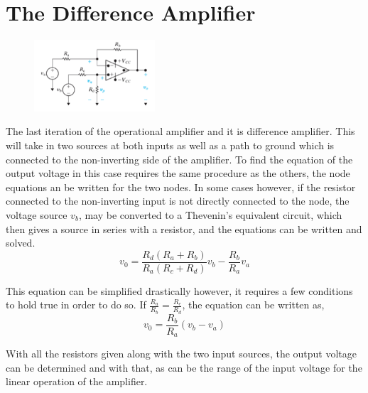 \documentclass[12pt]{article}
\begin{document}
    \section*{The Difference Amplifier}
    \begin{figure}[h]
        \centering
        \includegraphics[width=0.4\textwidth]{Difference Amplifier.png}
    \end{figure}
    \par The last iteration of the operational amplifier and it is difference
    amplifier. This will take in two sources at both inputs as well as a path to
    ground which is connected to the non-inverting side of the amplifier. To
    find the equation of the output voltage in this case requires the same
    procedure as the others, the node equations an be written for the two nodes.
    In some cases however, if the resistor connected to the non-inverting input is
    not directly connected to the node, the voltage source $v_b$, may be
    converted to a Thevenin's equivalent circuit, which then gives a source in
    series with a resistor, and the equations can be written and solved.
    \[
        v_0 = \frac{R_d(R_a + R_b)}{R_a(R_c + R_d)}v_b - \frac{R_b}{R_a}v_a
    \]
    \par This equation can be simplified drastically however, it requires a few
    conditions to hold true in order to do so. If $\frac{R_a}{R_b} =
    \frac{R_c}{R_d}$, the equation can be written as,
    \[
        v_0 = \frac{R_b}{R_a} (v_b - v_a)
    \]
    \par With all the resistors given along with the two input sources, the
    output voltage can be determined and with that, as can be the range of the
    input voltage for the linear operation of the amplifier.
\end{document}
